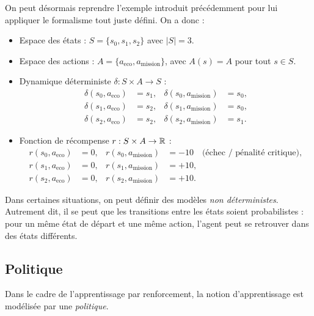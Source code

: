 \begin{example} \label{ex:nano-satellite-ar}
    On peut désormais reprendre l'exemple introduit précédemment pour lui appliquer le formalisme tout juste défini. On a donc : 
    \begin{itemize}
        \item {Espace des états} : $S = \{s_0, s_1, s_2\}$ avec $|S| = 3$.
        \item {Espace des actions} : $A = \{a_{\text{eco}}, a_{\text{mission}}\}$, avec $A(s) = A$ pour tout $s \in S$.
        \item {Dynamique déterministe} $\delta : S \times A \to S$ :
        \begin{align*}
            \delta(s_0, a_{\text{eco}}) &= s_1, & \delta(s_0, a_{\text{mission}}) &= s_0, \\
            \delta(s_1, a_{\text{eco}}) &= s_2, & \delta(s_1, a_{\text{mission}}) &= s_0, \\
            \delta(s_2, a_{\text{eco}}) &= s_2, & \delta(s_2, a_{\text{mission}}) &= s_1.
        \end{align*}
        \item {Fonction de récompense} $r : S \times A \to \mathbb{R}$ :
        \begin{align*}
            r(s_0, a_{\text{eco}}) &= 0,  & r(s_0, a_{\text{mission}}) &= -10 \quad \text{(échec / pénalité critique)}, \\
            r(s_1, a_{\text{eco}}) &= 0,  & r(s_1, a_{\text{mission}}) &= +10, \\
            r(s_2, a_{\text{eco}}) &= 0,  & r(s_2, a_{\text{mission}}) &= +10.
        \end{align*}
    \end{itemize}
\end{example}

Dans certaines situations, on peut définir des modèles \emph{non déterministes}. Autrement dit, il se peut que les transitions entre les états soient probabilistes : pour un même état de départ et une même action, l'agent peut se retrouver dans des états différents. 

\subsection{Politique}

Dans le cadre de l'apprentissage par renforcement, la notion d'apprentissage est modélisée par une \emph{politique}. 


